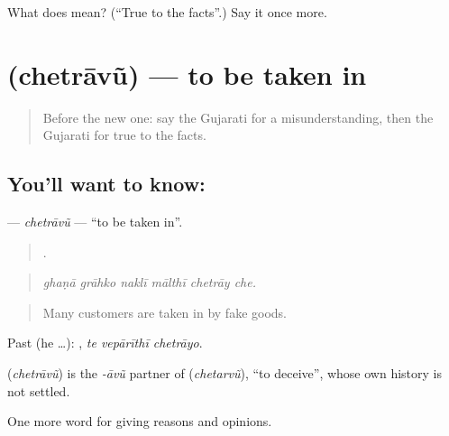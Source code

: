 \begin{tcolorbox}[breakable,colback=teal!4,colframe=teal!35!black,title={Before you move on}]
What does  mean? (\textquotedblleft{}True to the facts\textquotedblright{}.) Say it once more.
\end{tcolorbox}
\section[\texorpdfstring{\gu{છેતરાવું} (chetrāvũ)}{છેતરાવું (chetrāvũ)}]{ (chetrāvũ) — to be taken in}

\label{lesson:GU-C351-chetravu}



\begin{quote}
Before the new one: say the Gujarati for a misunderstanding, then the Gujarati for true to the facts.
\end{quote}

\subsection*{You'll want to know: }
\textbf{} — \emph{chetrāvũ} — \textquotedblleft{}to be taken in\textquotedblright{}.

\begin{quote}
     .
\end{quote}

\begin{quote}
\emph{ghaṇā grāhko naklī mālthī chetrāy che.}
\end{quote}

\begin{quote}
Many customers are taken in by fake goods.
\end{quote}

Past (he …):   , \emph{te vepārīthī chetrāyo}.

\begin{cousinweb}
\textbf{} (\emph{chetrāvũ}) is the \emph{-āvũ} partner of \textbf{} (\emph{chetarvũ}), \textquotedblleft{}to deceive\textquotedblright{}, whose own history is not settled.
\end{cousinweb}

\begin{grammarlens}[title={What you've built}]
One more word for giving reasons and opinions.
\end{grammarlens}

